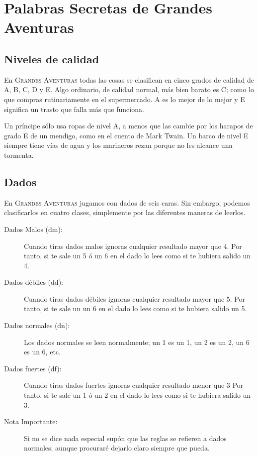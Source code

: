 \chapter{Palabras Secretas de Grandes Aventuras}

\varhrulefill

\section{Niveles de calidad}

En \textsc{Grandes Aventuras} todas las cosas se clasifican en cinco grados de calidad de A, B, C, D y E. Algo ordinario, de calidad normal, más bien barato es C; como lo que compras rutinariamente en el supermercado. A es lo mejor de lo mejor y E significa un trasto que falla más que funciona.

Un príncipe sólo usa ropas de nivel A, a menos que las cambie por los harapos de grado E de un mendigo, como en el cuento de Mark Twain. Un barco de nivel E siempre tiene vías de agua y los marineros rezan porque no les alcance una tormenta. 

\section{Dados}

En \textsc{Grandes Aventuras} jugamos con dados de seis caras. Sin embargo, podemos clasificarlos en cuatro clases, simplemente por las diferentes maneras de leerlos.

\begin{description}

\item[Dados Malos (dm):]
Cuando tiras dados malos ignoras cualquier resultado mayor que 4. Por tanto, si te sale un 5 ó un 6 en el dado lo lees como si te hubiera salido un 4.

\item[Dados débiles (dd):]
Cuando tiras dados débiles ignoras cualquier resultado mayor que 5. Por tanto, si te sale un un 6 en el dado lo lees como si te hubiera salido un 5.

\item[Dados normales (dn):]
Los dados normales se leen normalmente; un 1 es un 1, un 2 es un 2, un 6 es un 6, etc. 

\item[Dados fuertes (df):] 
Cuando tiras dados fuertes ignoras cualquier resultado menor que 3 Por tanto, si te sale un 1 ó un 2 en el dado lo lees como si te hubiera salido un 3.

\item[Nota Importante: ]
Si no se dice nada especial supón que las reglas se refieren a dados normales; aunque procuraré dejarlo claro siempre que pueda.

\end{description}

